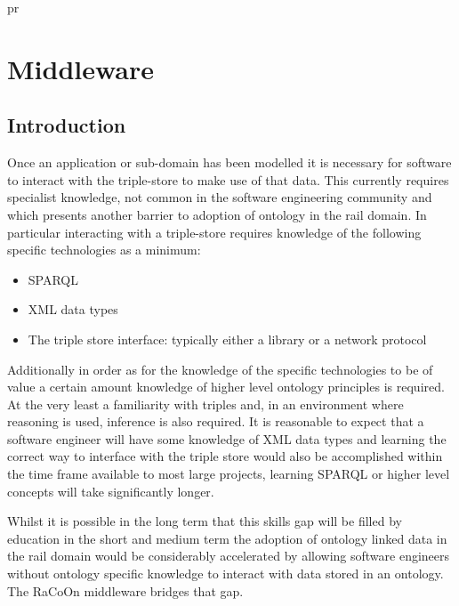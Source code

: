 pr%
\chapter{Middleware}\label{ch:middleware}
\section{Introduction}\label{sec:mwintro}
Once an application or sub-domain has been modelled it is necessary for software to interact with the triple-store to make use of that data. This currently requires specialist knowledge, not common in the software engineering community and which presents another barrier to adoption of ontology in the rail domain. In particular interacting with a triple-store requires knowledge of the following specific technologies as a minimum:
\begin{itemize}
    \item SPARQL
    \item XML data types 
    \item The triple store interface: typically either a library or a network protocol
\end{itemize}

Additionally in order as for the knowledge of the specific technologies to be of value a certain amount knowledge of higher level ontology principles is required. At the very least a familiarity with triples and, in an environment where reasoning is used, inference is also required. It is reasonable to expect that a software engineer will have some knowledge of XML data types and learning the correct way to interface with the triple store would also be accomplished within the time frame available to most large projects, learning SPARQL or higher level concepts will take significantly longer.

Whilst it is possible in the long term that this skills gap will be filled by education in the short and medium term the adoption of ontology linked data in the rail domain would be considerably accelerated by allowing software engineers without ontology specific knowledge to interact with data stored in an ontology. The RaCoOn middleware bridges that gap.


